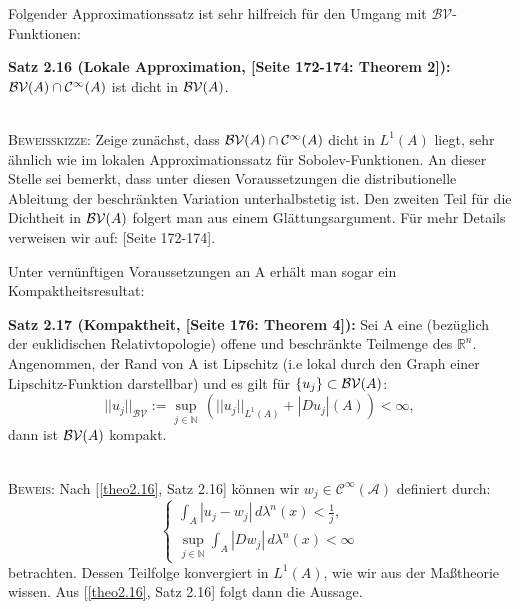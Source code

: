 Folgender Approximationssatz ist sehr hilfreich für den Umgang mit \(\mathcal{BV}\)-Funktionen:\\[0.5cm]
\colorbox{generalYellow}{\begin{minipage}{16cm}{\textcolor{black}{}{\label{theo2.16}}}
\textbf{Satz 2.16 (Lokale Approximation, \cite{EvansMeaTh}[Seite 172-174: Theorem 2]):} \(\mathcal{BV}(A) \cap \mathcal{C}^{\infty}(A)\) ist dicht in \(\mathcal{BV}(A)\).
\end{minipage}}\\

\textsc{Beweisskizze:} Zeige zunächst, dass \(\mathcal{BV}(A) \cap \mathcal{C}^{\infty}(A)\) dicht in \(L^1(A)\) liegt, sehr ähnlich wie im lokalen Approximationssatz für Sobolev-Funktionen. An dieser Stelle sei bemerkt, dass unter diesen Voraussetzungen die distributionelle Ableitung der beschränkten Variation unterhalbstetig ist. Den zweiten Teil für die Dichtheit in \(\mathcal{BV}(A)\) folgert man aus einem Glättungsargument. Für mehr Details verweisen wir auf: \cite{EvansMeaTh}[Seite 172-174].\QEDB

Unter vernünftigen Voraussetzungen an A erhält man sogar ein Kompaktheitsresultat:\\[0.5cm]
\colorbox{generalYellow}{\begin{minipage}{16cm}{\textcolor{black}{}{\label{theo2.17}}}
\textbf{Satz 2.17 (Kompaktheit, \cite{EvansMeaTh}[Seite 176: Theorem 4]):} Sei A eine (bezüglich der euklidischen Relativtopologie) offene und beschränkte Teilmenge des \(\mathbb{R}^n.\) Angenommen, der Rand von A ist Lipschitz (i.e lokal durch den Graph einer Lipschitz-Funktion darstellbar) und es gilt für \(\{u_j\} \subset \mathcal{BV}(A)\):
\begin{equation}
    ||u_j||_{\mathcal{BV}} := \sup_{j \in \mathbb{N}} \, (||u_j||_{L^1(A)} + |Du_j|(A)) < \infty,
\end{equation}
dann ist \(\mathcal{BV}(A)\) kompakt.
\end{minipage}}\\

\textsc{Beweis:} Nach [\ref{theo2.16}, Satz 2.16] können wir \(w_j \in \mathcal{C^{\infty}(A)}\) definiert durch:
\begin{equation}
    \begin{cases}
        \int_A |u_j - w_j| \, d\lambda^n(x) < \frac{1}{j},\\ \sup_{j \in \mathbb{N}} \int_A |D w_j| \, d\lambda^n(x) < \infty
    \end{cases}
\end{equation}
betrachten. Dessen Teilfolge konvergiert in \(L^1(A)\), wie wir aus der Maßtheorie wissen. Aus [\ref{theo2.16}, Satz 2.16] folgt dann die Aussage.\QEDB

